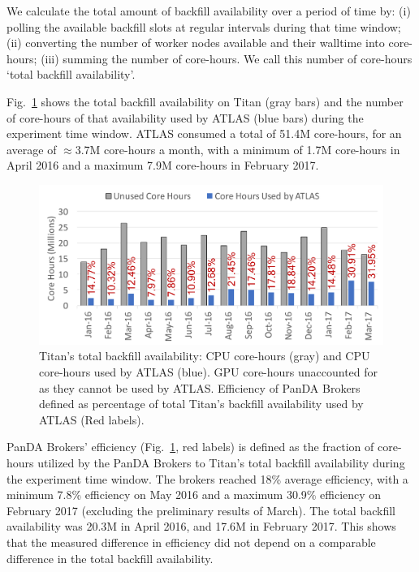 \documentclass[conference]{IEEEtran}
\begin{document}
We calculate the total amount of backfill availability over a period of time by:
(i) polling the available backfill slots at regular intervals during that time
window; (ii) converting the number of worker nodes available and their walltime
into core-hours; (iii) summing the number of core-hours. We call this number of
core-hours `total backfill availability'.

Fig.~\ref{fig:backfill-utilization} shows the total backfill availability on
Titan (gray bars) and the number of core-hours of that availability used by
ATLAS (blue bars) during the experiment time window. ATLAS consumed a total of
51.4M core-hours, for an average of $\approx$3.7M core-hours a month, with a
minimum of 1.7M core-hours in April 2016 and a maximum 7.9M core-hours in
February 2017.

\begin{figure}[!t]
    \includegraphics[clip,width=\columnwidth]{backfill_consumption.pdf}
    \caption{Titan's total backfill availability: CPU core-hours (gray) and CPU
    core-hours used by ATLAS (blue). GPU core-hours unaccounted for as they
    cannot be used by ATLAS. Efficiency of PanDA Brokers defined as percentage
    of total Titan's backfill availability used by ATLAS (Red labels).}
\label{fig:backfill-utilization}
\end{figure}

PanDA Brokers' efficiency (Fig.~\ref{fig:backfill-utilization}, red labels) is
defined as the fraction of core-hours utilized by the PanDA Brokers to  Titan’s
total backfill availability during the experiment time window. The brokers
reached 18\% average efficiency, with a minimum 7.8\% efficiency on May 2016 and
a maximum 30.9\% efficiency on February 2017 (excluding the preliminary results
of March). The total backfill availability was 20.3M in April 2016, and 17.6M in
February 2017. This shows that the measured difference in efficiency did not
depend on a comparable difference in the total backfill availability.
\end{document}
